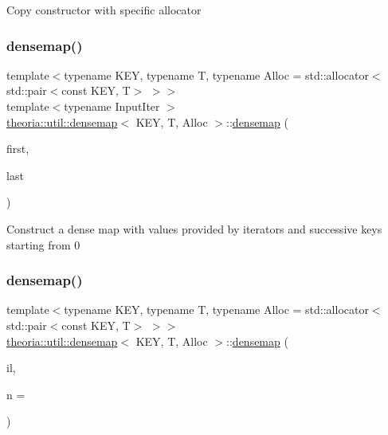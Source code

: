 Copy constructor with specific allocator \mbox{\label{classtheoria_1_1util_1_1densemap_abd0a8736cb03cb0e4bbc7489a5274c78}} 
\subsubsection{\texorpdfstring{densemap()}{densemap()}\hspace{0.1cm}{\footnotesize\ttfamily [6/7]}}
{\footnotesize\ttfamily template$<$typename K\+EY, typename T, typename Alloc = std\+::allocator$<$std\+::pair$<$const K\+E\+Y, T$>$ $>$$>$ \\
template$<$typename Input\+Iter $>$ \\
\hyperlink{classtheoria_1_1util_1_1densemap}{theoria\+::util\+::densemap}$<$ K\+EY, T, Alloc $>$\+::\hyperlink{classtheoria_1_1util_1_1densemap}{densemap} (\begin{DoxyParamCaption}\item[{Input\+Iter}]{first,  }\item[{Input\+Iter}]{last }\end{DoxyParamCaption})\hspace{0.3cm}{\ttfamily [inline]}}

Construct a dense map with values provided by iterators and successive keys starting from 0 \mbox{\label{classtheoria_1_1util_1_1densemap_a2fbff5aaf475fbd8492c9c766614517b}} 
\subsubsection{\texorpdfstring{densemap()}{densemap()}\hspace{0.1cm}{\footnotesize\ttfamily [7/7]}}
{\footnotesize\ttfamily template$<$typename K\+EY, typename T, typename Alloc = std\+::allocator$<$std\+::pair$<$const K\+E\+Y, T$>$ $>$$>$ \\
\hyperlink{classtheoria_1_1util_1_1densemap}{theoria\+::util\+::densemap}$<$ K\+EY, T, Alloc $>$\+::\hyperlink{classtheoria_1_1util_1_1densemap}{densemap} (\begin{DoxyParamCaption}\item[{std\+::initializer\+\_\+list$<$ \hyperlink{classtheoria_1_1util_1_1densemap_a6d2419665695def56b2abbd849f74b08}{value\+\_\+type} $>$}]{il,  }\item[{\hyperlink{classtheoria_1_1util_1_1densemap_a133075e61db44e086c734c8a32ca6ab2}{size\+\_\+type}}]{n = {} }\end{DoxyParamCaption})\hspace{0.3cm}{\ttfamily [inline]}}

